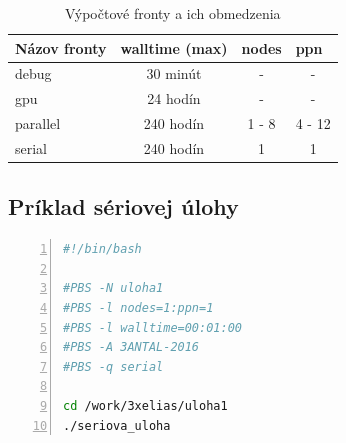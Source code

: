 \begin{table}[!h]
\centering
\begin{tabular}{@{}lccc@{}}
\toprule
\textbf{Názov fronty} & \multicolumn{1}{l}{\textbf{walltime (max)}} & \multicolumn{1}{l}{\textbf{nodes}} & \multicolumn{1}{l}{\textbf{ppn}} \\ \midrule
debug                 & 30 minút                                    & -                                  & -                                      \\
gpu                   & 24 hodín                                    & -                                  & -                                      \\
parallel              & 240 hodín                                   & 1 - 8                              & 4 - 12                                 \\
serial                & 240 hodín                                   & 1                                  & 1                                      \\ \bottomrule
\end{tabular}
\caption{Výpočtové fronty a ich obmedzenia}
\label{tab:fronty}
\end{table}

\subsection{Príklad sériovej úlohy}

\begin{lstlisting}[language=bash, caption={uloha1.pbs}, label={pbs:1}, numbers=left]
#!/bin/bash

#PBS -N uloha1
#PBS -l nodes=1:ppn=1
#PBS -l walltime=00:01:00  
#PBS -A 3ANTAL-2016
#PBS -q serial

cd /work/3xelias/uloha1
./seriova_uloha
\end{lstlisting}


